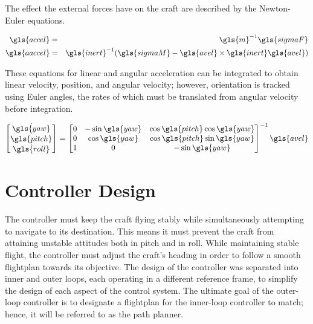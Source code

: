 \documentclass{sydeStyle}
\begin{document}
The effect the external forces have on the craft are described by the
Newton-Euler equations.

\begin{eqnarray*}
\gls{accel}  &=& \gls{m}^{-1} \gls{sigmaF} \\
\gls{aaccel} &=& \gls{inert}^{-1}(\gls{sigmaM} - \gls{avel} \times \gls{inert} \gls{avel}) \\
\end{eqnarray*}

These equations for linear and angular acceleration can be integrated to obtain
linear velocity, position, and angular velocity; however, orientation is tracked
using Euler angles, the rates of which must be translated from angular velocity
before integration.

\begin{displaymath}
\left[ \begin{matrix}
\dot{\gls{yaw}} \\
\dot{\gls{pitch}} \\
\dot{\gls{roll}}
\end{matrix} \right] = \left[ \begin{matrix}
0 & -\sin \gls{yaw} &  \cos \gls{pitch} \cos \gls{yaw} \\
0 &  \cos \gls{yaw} &  \cos \gls{pitch} \sin \gls{yaw} \\
1 &  0              & -\sin \gls{yaw}
\end{matrix} \right] ^{-1} \gls{avel}
\end{displaymath}

\section{Controller Design}
\label{sec:ctrldes}

The controller must keep the craft flying stably while simultaneously attempting
to navigate to its destination.  This means it must prevent the craft from
attaining unstable attitudes both in pitch and in roll.  While
maintaining stable flight, the controller must adjust the craft's heading in
order to follow a smooth flightplan towards its objective.  The design of the
controller was separated into inner and outer loops, each operating in a
different reference frame, to simplify the design of each aspect of the control
system.  The ultimate goal of the outer-loop controller is to designate a
flightplan for the inner-loop controller to match; hence, it will be referred to
as the path planner.
\end{document}
